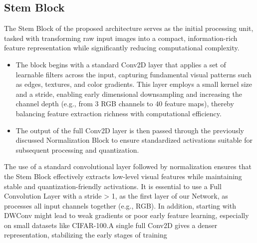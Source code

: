 \subsection{Stem Block}

The Stem Block of the proposed architecture serves as the initial processing unit, tasked with transforming raw input images into a compact, information-rich feature representation while significantly reducing computational complexity. 

\begin{itemize}

    \item The block begins with a standard Conv2D layer that applies a set of learnable filters across the input, capturing fundamental visual patterns such as edges, textures, and color gradients. This layer employs a small kernel size and a stride, enabling early dimensional downsampling and increasing the channel depth (e.g., from 3 RGB channels to 40 feature maps), thereby balancing feature extraction richness with computational efficiency.
    
    \item The output of the full Conv2D layer is then passed through the previously discussed Normalization Block to ensure standardized activations suitable for subsequent processing and quantization.
    
\end{itemize}

The use of a standard convolutional layer followed by normalization ensures that the Stem Block effectively extracts low-level visual features while maintaining stable and quantization-friendly activations. It is essential to use a Full Convolution Layer with a stride > 1,  as the first layer of our Network, as processes all input channels together (e.g., RGB). In addition, starting with DWConv might lead to weak gradients or poor early feature learning, especially on small datasets like CIFAR-100.A single full Conv2D gives a denser representation, stabilizing the early stages of training 
\cite{ConvNetworksMobileNets}

